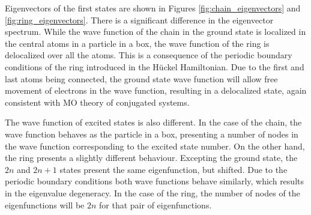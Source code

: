 \documentclass{article}
\begin{document}
Eigenvectors of the first states are shown in Figures \ref{fig:chain_eigenvectors} and \ref{fig:ring_eigenvectors}. There is a significant difference in the eigenvector spectrum. While the wave function of the chain in the ground state is localized in the central atoms in a particle in a box, the wave function of the ring is delocalized over all the atoms. This is a consequence of the periodic boundary conditions of the ring introduced in the Hückel Hamiltonian. Due to the first and last atoms being connected, the ground state wave function will allow free movement of electrons in the wave function, resulting in a delocalized state, again consistent with MO theory of conjugated systems.

The wave function of excited states is also different. In the case of the chain, the wave function behaves as the particle in a box, presenting a number of nodes in the wave function corresponding to the excited state number. On the other hand, the ring presents a slightly different behaviour. Excepting the ground state, the $2n$ and $2n+1$ states present the same eigenfunction, but shifted. Due to the periodic boundary conditions both wave functions behave similarly, which results in the eigenvalue degeneracy. In the case of the ring, the number of nodes of the eigenfunctions will be $2n$ for that pair of eigenfunctions. 
\end{document}
